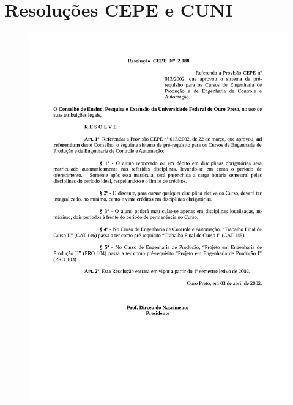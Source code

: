 \chapter{Resoluções CEPE e CUNI} 
\label{ape:02} 
\label{cepe2088}
\begin{figure}[p]
	\centering 
	\includegraphics[scale=0.7]{capitulos/resolucoes/cepe2088.pdf}
\end{figure} \pagebreak

